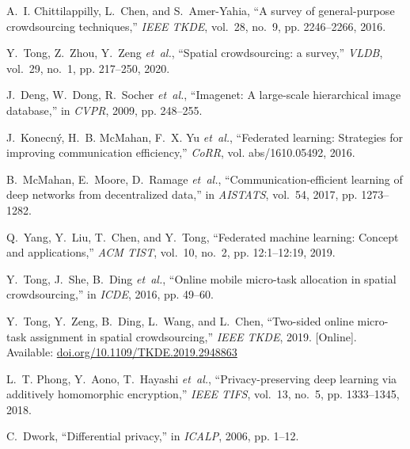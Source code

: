 \documentclass[11pt]{article}
\begin{document}
\begin{thebibliography}{10}
	\itemsep=1pt
	\begin{small}
		A.~I. Chittilappilly, L.~Chen, and S.~Amer{-}Yahia, ``A survey of
		general-purpose crowdsourcing techniques,'' \emph{{IEEE} TKDE}, vol.~28,
		no.~9, pp. 2246--2266, 2016.
		
		Y.~Tong, Z.~Zhou, Y.~Zeng \emph{et~al.}, ``Spatial crowdsourcing: a survey,''
		\emph{{VLDB}}, vol.~29, no.~1, pp. 217--250, 2020.
		
		J.~Deng, W.~Dong, R.~Socher \emph{et~al.}, ``Imagenet: {A} large-scale
		hierarchical image database,'' in \emph{CVPR}, 2009, pp. 248--255.
		
		J.~Konecn{\'{y}}, H.~B. McMahan, F.~X. Yu \emph{et~al.}, ``Federated learning:
		Strategies for improving communication efficiency,'' \emph{CoRR}, vol.
		abs/1610.05492, 2016.
		
		B.~McMahan, E.~Moore, D.~Ramage \emph{et~al.}, ``Communication-efficient
		learning of deep networks from decentralized data,'' in \emph{AISTATS},
		vol.~54, 2017, pp. 1273--1282.
		
		Q.~Yang, Y.~Liu, T.~Chen, and Y.~Tong, ``Federated machine learning: Concept
		and applications,'' \emph{{ACM} TIST}, vol.~10, no.~2, pp. 12:1--12:19, 2019.
		
		Y.~Tong, J.~She, B.~Ding \emph{et~al.}, ``Online mobile micro-task allocation
		in spatial crowdsourcing,'' in \emph{ICDE}, 2016, pp. 49--60.
		
		Y.~{Tong}, Y.~{Zeng}, B.~{Ding}, L.~{Wang}, and L.~{Chen}, ``Two-sided online
		micro-task assignment in spatial crowdsourcing,'' \emph{IEEE TKDE}, 2019.
		[Online]. Available: \url{doi.org/10.1109/TKDE.2019.2948863}
		
		L.~T. Phong, Y.~Aono, T.~Hayashi \emph{et~al.}, ``Privacy-preserving deep
		learning via additively homomorphic encryption,'' \emph{{IEEE} TIFS},
		vol.~13, no.~5, pp. 1333--1345, 2018.
		
		C.~Dwork, ``Differential privacy,'' in \emph{ICALP}, 2006, pp. 1--12.
		

\end{small}
\end{thebibliography}
\end{document}
